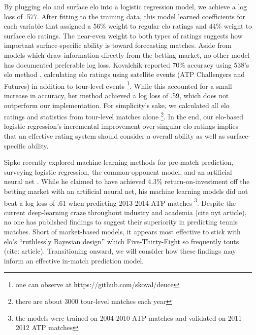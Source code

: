 \documentclass[chapterprefix=false]{report}
\begin{document}
By plugging elo and surface elo into a logistic regression model, we achieve a log loss of .577. After fitting to the training data, this model learned coefficients for each variable that assigned a 56\% weight to regular elo ratings and 44\% weight to surface elo ratings. The near-even weight to both types of ratings suggests how important surface-specific ability is toward forecasting matches. Aside from models which draw information directly from the betting market, no other model has documented preferable log loss. Kovalchik reported 70$\%$ accuracy using 538's elo method \cite{Kovalchik2016}, calculating elo ratings using satellite events (ATP Challengers and Futures) in addition to tour-level events \footnote{one can observe at https://github.com/skoval/deuce}. While this accounted for a small increase in accuracy, her method achieved a log loss of .59, which does not outperform our implementation. For simplicity's sake, we calculated all elo ratings and statistics from tour-level matches alone \footnote{there are about 3000 tour-level matches each year}. In the end, our elo-based logistic regression's incremental improvement over singular elo ratings implies that an effective rating system should consider a overall ability as well as surface-specific ability.




Sipko recently explored machine-learning methods for pre-match prediction, surveying logistic regression, the common-opponent model, and an artificial neural net \cite{Sipko2015}. While he claimed to have achieved 4.3$\%$ return-on-investment off the betting market with an artificial neural net, his machine learning models did not beat a log loss of .61 when predicting 2013-2014 ATP matches \footnote{the models were trained on 2004-2010 ATP matches and validated on 2011-2012 ATP matches}. Despite the current deep-learning craze throughout industry and academia (cite nyt article), no one has published findings to suggest their superiority in predicting tennis matches. Short of market-based models, it appears most effective to stick with elo's ``ruthlessly Bayesian design'' which Five-Thirty-Eight so frequently touts (cite: article). Transitioning onward, we will consider how these findings may inform an effective in-match prediction model.
\end{document}
